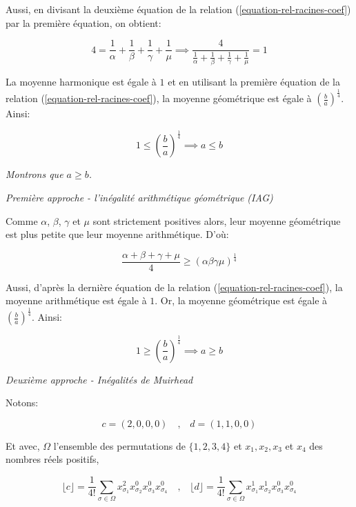 \documentclass[12pt,a4paper,article]{memoir}
\newcommand{\floor}[1]{\lfloor #1 \rfloor}
\begin{document}
Aussi, en divisant la deuxième équation de la relation (\ref{equation-rel-racines-coef}) par la première équation, on obtient:

\[4 = \frac{1}{\alpha} + \frac{1}{\beta} + \frac{1}{\gamma} + \frac{1}{\mu} \implies \frac{4}{\frac{1}{\alpha} + \frac{1}{\beta} + \frac{1}{\gamma} + \frac{1}{\mu}} = 1\]

La moyenne harmonique est égale à $1$ et en utilisant la première équation de la relation (\ref{equation-rel-racines-coef}), la moyenne géométrique est égale à $\left(\frac{b}{a}\right)^{\frac{1}{4}}$. Ainsi:

\[1 \leq \left(\frac{b}{a}\right)^{\frac{1}{4}} \implies a \leq b\]

\bigskip

\textit{Montrons que $a \geq b$.}

\bigskip

\textit{Première approche - l'inégalité arithmétique géométrique (IAG)}

\bigskip

Comme $\alpha$, $\beta$, $\gamma$ et $\mu$ sont strictement positives alors, leur moyenne géométrique est plus petite que leur moyenne arithmétique. D'où:

\begin{equation}
\frac{\alpha + \beta + \gamma + \mu}{4} \geq (\alpha \beta \gamma \mu)^{\frac{1}{4}}
\label{equation-iag}
\end{equation}

Aussi, d'après la dernière équation de la relation (\ref{equation-rel-racines-coef}), la moyenne arithmétique est égale à $1$. Or, la moyenne géométrique est égale à $\left(\frac{b}{a}\right)^{\frac{1}{4}}$. Ainsi:

\[1 \geq \left(\frac{b}{a}\right)^{\frac{1}{4}} \implies a \geq b\]

\bigskip

\textit{Deuxième approche - Inégalités de Muirhead}

\bigskip

Notons:

\[c = (2, 0, 0, 0) \quad \textrm{,} \quad d = (1, 1, 0, 0)\]

Et avec, $\Omega$ l'ensemble des permutations de $\{1, 2, 3, 4\}$ et $x_{1}, x_{2}, x_{3}$ et $x_{4}$ des nombres réels positifs, 

\[\floor{c} = \frac{1}{4!}\sum_{\sigma \in \Omega} x_{\sigma_{1}}^{2}x_{\sigma_{2}}^{0}x_{\sigma_{3}}^{0}x_{\sigma_{4}}^{0} \quad \textrm{,} \quad \floor{d} = \frac{1}{4!}\sum_{\sigma \in \Omega} x_{\sigma_{1}}^{1}x_{\sigma_{2}}^{1}x_{\sigma_{3}}^{0}x_{\sigma_{4}}^{0}\]
\end{document}
